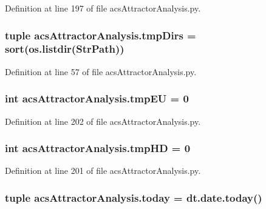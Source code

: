 Definition at line 197 of file acs\-Attractor\-Analysis.\-py.

\hypertarget{a00122_ac88c3245a42ebefee3fcf90626f6eaf4}{
\subsubsection[{tmp\-Dirs}]{\setlength{\rightskip}{0pt plus 5cm}tuple acs\-Attractor\-Analysis.\-tmp\-Dirs = sort(os.\-listdir({\bf Str\-Path}))}}\label{a00122_ac88c3245a42ebefee3fcf90626f6eaf4}


Definition at line 57 of file acs\-Attractor\-Analysis.\-py.

\hypertarget{a00122_a0c4860774229747cda9dabe70614abc6}{
\subsubsection[{tmp\-E\-U}]{\setlength{\rightskip}{0pt plus 5cm}int acs\-Attractor\-Analysis.\-tmp\-E\-U = 0}}\label{a00122_a0c4860774229747cda9dabe70614abc6}


Definition at line 202 of file acs\-Attractor\-Analysis.\-py.

\hypertarget{a00122_a1fe1582f1d1dc5f55558d25c8eb30ad7}{
\subsubsection[{tmp\-H\-D}]{\setlength{\rightskip}{0pt plus 5cm}int acs\-Attractor\-Analysis.\-tmp\-H\-D = 0}}\label{a00122_a1fe1582f1d1dc5f55558d25c8eb30ad7}


Definition at line 201 of file acs\-Attractor\-Analysis.\-py.

\hypertarget{a00122_a71bc5e3d205016fb7893b438e75be78e}{
\subsubsection[{today}]{\setlength{\rightskip}{0pt plus 5cm}tuple acs\-Attractor\-Analysis.\-today = dt.\-date.\-today()}}\label{a00122_a71bc5e3d205016fb7893b438e75be78e}


